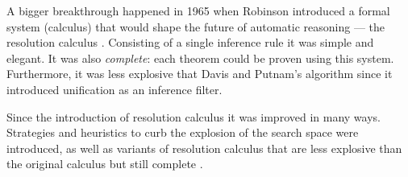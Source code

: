 A bigger breakthrough happened in 1965 when Robinson introduced a formal system
(calculus) that would shape the future of automatic reasoning --- the resolution
calculus \cite{ar-65-resolution}. Consisting of a single inference rule it was
simple and elegant. It was also \emph{complete}: each theorem could be proven
using this system. Furthermore, it was less explosive that Davis and Putnam's
algorithm since it introduced unification as an inference filter.

Since the introduction of resolution calculus it was improved in many ways.
Strategies and heuristics \cite{lw-65-sos} to curb the explosion of the search
space were introduced, as well as variants of resolution calculus that are less
explosive than the original calculus but still complete .














